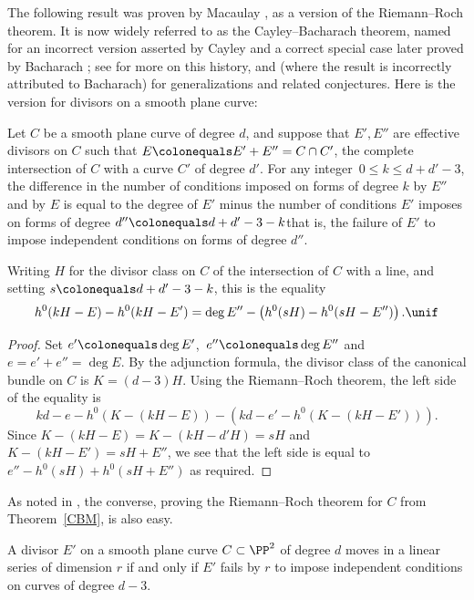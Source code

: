 The following result was proven by Macaulay \cite[p.~424]{Macaulay1900}, as a version of the Riemann--Roch theorem. It is now widely referred to as the Cayley--Bacharach theorem, named for an
%
%
incorrect version asserted by Cayley and a correct special case later proved by
Bacharach \cite{Bacharach1886}; see \cite[Section 2.3]{eisenbud-gray} for more on this history, and
\cite{MR1376653} (where the result is incorrectly attributed to Bacharach) for generalizations and related conjectures. Here is the version for divisors on a smooth plane curve:

\begin{theorem}\label{CBM} Let $C$ be a smooth plane curve of degree $d$, and suppose that
$E', E''$ are effective divisors on $C$ such that $E\colonequals E'+E'' = C\cap C'$, the complete intersection of $C$
with a curve $C'$ of degree $d'$. For any integer
$\,0\leq k \leq d+d'-3$, the difference in the number of conditions imposed
on forms of degree $k$ by $E''$ and by $E$ is equal to the degree of $E'$ minus the
number of conditions $E'$ imposes on forms of degree
$d''\colonequals d+d'-3 -k$\emdash that is, the failure of
$E'$ to impose
independent conditions
%
on forms of degree $d''$.

 Writing $H$ for
the divisor class on $C$ of the intersection of $C$ with a line, and setting $s \colonequals d+d'-3-k$, this is the equality
$$
h^0(kH-E) - h^0(kH-E')  = \deg E'' - \left(h^0(sH) -  h^0(sH-E'')\right)
.
\unif
$$
\end{theorem}

\begin{proof}
Set $e' \colonequals \deg E'$, \,$e''\colonequals \deg E''$ and $e = e'+e'' = \deg E$.
By the adjunction formula, the divisor class of the canonical bundle
on $C$ is $K = (d-3)H$. Using the Riemann--Roch theorem, the left side
of the equality is
$$
kd-e-h^0(K - (kH-E)) - \left(kd-e' - h^0(K-(kH-E'))\right).
$$
Since $K - (kH-E) = K - (kH-d'H) = sH$ and  $K-(kH-E') = sH+E''$, we see that the
left side is equal to
$
e'' - h^0(sH) +  h^0(sH+E'')
$
as required.
\unif
\end{proof}

As noted in \cite{eisenbud-gray}, the converse, proving the Riemann--Roch theorem for $C$ from Theorem~\ref{CBM}, is also easy.

\begin{corollary}\label{CBM cor 1}
A divisor $E'$ on a smooth plane curve $C\subset \PP^2$ of degree $d$ moves
in a linear series of dimension $r$ if and only if $E'$ fails by $r$ to impose
independent conditions on curves of degree $d-3$.
\unif
\end{corollary}

